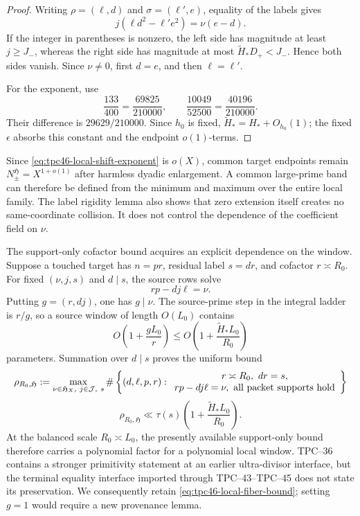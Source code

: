 \begin{proof}
Writing \(\rho=(\ell,d)\) and \(\sigma=(\ell',e)\), equality of the
labels gives
\begin{equation}
 j(\ell d^2-\ell'e^2)=\nu(e-d).
 \label{eq:tpc46-local-collision-equation}
\end{equation}
If the integer in parentheses is nonzero, the left side has magnitude
at least \(j\ge J_-\), whereas the right side has magnitude at most
 \(\widetilde H_*D_+<J_-\).  Hence both sides vanish.  Since
 \(\nu\ne0\), first
\(d=e\), and then \(\ell=\ell'\).

For the exponent, use
\[
 \frac{133}{400}=\frac{69825}{210000},
 \qquad
 \frac{10049}{52500}=\frac{40196}{210000}.
\]
Their difference is \(29629/210000\).  Since \(h_0\) is fixed,
\(\widetilde H_*=H_*+O_{h_0}(1)\); the fixed \(\epsilon\) absorbs this
constant and the endpoint \(o(1)\)-terms.
\end{proof}

Since \eqref{eq:tpc46-local-shift-exponent} is \(o(X)\), common target
endpoints remain \(N_\pm^{\mathfrak H}=X^{1+o(1)}\) after harmless
dyadic enlargement.  A common large-prime band can therefore be defined
from the minimum and maximum over the entire local family.  The label
rigidity lemma also shows that zero extension itself creates no
same-coordinate collision.  It does not control the dependence of the
coefficient field on \(\nu\).

The support-only cofactor bound acquires an explicit dependence on the
window.  Suppose a touched target has \(n=pr\), residual label \(s=dr\),
and cofactor \(r\asymp R_0\).  For fixed \((\nu,j,s)\) and \(d\mid s\),
the source rows solve
\begin{equation}
 rp-dj\ell=\nu.
 \label{eq:tpc46-local-determinant-ladder}
\end{equation}
Putting \(g=(r,dj)\), one has \(g\mid\nu\).  The source-prime step in
the integral ladder is \(r/g\), so a source window of length \(O(L_0)\)
contains
\[
 O\!\left(1+\frac{gL_0}{r}\right)
 \le O\!\left(1+\frac{\widetilde H_*L_0}{R_0}\right)
\]
parameters.  Summation over \(d\mid s\) proves the uniform bound
\[
 \rho_{R_0,\mathfrak H}
 :=
 \max_{\substack{\nu\in\mathfrak H_X,\ j\in\mathcal J,\ s}}
 \#\left\{(d,\ell,p,r):
 \begin{array}{c}
 r\asymp R_0,\ dr=s,\\
 rp-dj\ell=\nu,\ \text{all packet supports hold}
 \end{array}\right\}
\]
\vspace{-4pt}
\begin{equation}
 \boxed{
 \rho_{R_0,\mathfrak H}
 \ll \tau(s)\left(1+\frac{\widetilde H_*L_0}{R_0}\right).}
 \label{eq:tpc46-local-fiber-bound}
\end{equation}
At the balanced scale \(R_0\asymp L_0\), the presently available
support-only bound therefore carries a polynomial factor for a
polynomial local window.  TPC--36 contains a
stronger primitivity statement at an earlier ultra-divisor interface,
but the terminal equality interface imported through TPC--43--TPC--45
does not state its preservation.  We consequently retain
\eqref{eq:tpc46-local-fiber-bound}; setting \(g=1\) would require a new
provenance lemma.


